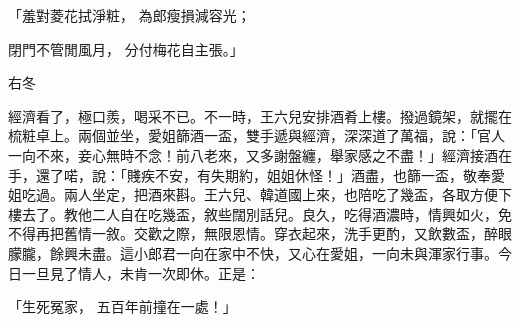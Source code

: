 \begin{showcontents}{}
「羞對菱花拭淨粧，  為郎瘦損減容光；

閉門不管閒風月，  分付梅花自主張。」

右冬

經濟看了，極口羨，喝采不已。不一時，王六兒安排酒肴上樓。撥過鏡架，就擺在梳粧卓上。兩個並坐，愛姐篩酒一盃，雙手遞與經濟，深深道了萬福，說：「官人一向不來，妾心無時不念！前八老來，又多謝盤纏，舉家感之不盡！」經濟接酒在手，還了喏，說：「賤疾不安，有失期約，姐姐休怪！」酒盡，也篩一盃，敬奉愛姐吃過。兩人坐定，把酒來斟。王六兒、韓道國上來，也陪吃了幾盃，各取方便下樓去了。教他二人自在吃幾盃，敘些闊別話兒。良久，吃得酒濃時，情興如火，免不得再把舊情一敘。交歡之際，無限恩情。穿衣起來，洗手更酌，又飲數盃，醉眼朦朧，餘興未盡。這小郎君一向在家中不快，又心在愛姐，一向未與渾家行事。今日一旦見了情人，未肯一次即休。正是：

「生死冤家，  五百年前撞在一處！」


\end{showcontents}
